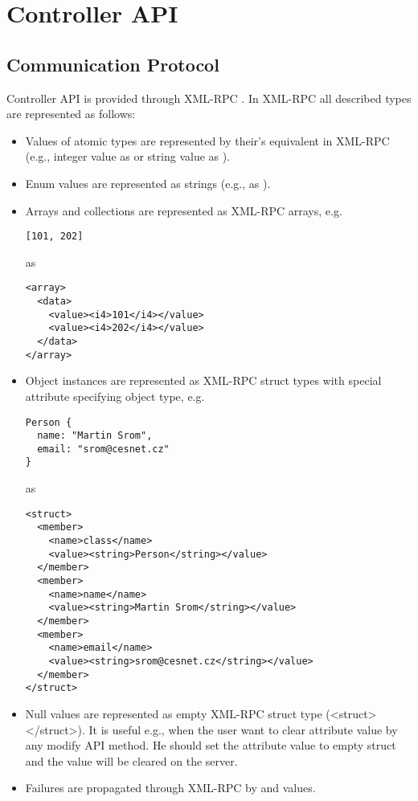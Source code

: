 \chapter{Controller API}



\section{Communication Protocol}
Controller API is provided through XML-RPC \cite{xml-rpc}.
In XML-RPC all described types are represented as follows:

\begin{itemize}

\item Values of atomic types are represented by their's equivalent in XML-RPC (e.g., integer value  as  or string value  as ).

\item Enum values are represented as strings (e.g.,  as ).

\item Arrays and collections are represented as XML-RPC arrays, e.g.
\begin{verbatim}
[101, 202]
\end{verbatim}
as
\begin{verbatim}
<array>
  <data>
    <value><i4>101</i4></value>
    <value><i4>202</i4></value>
  </data>
</array>
\end{verbatim}

\item Object instances are represented as XML-RPC struct types with special  attribute specifying object type, e.g.
\begin{verbatim}
Person {
  name: "Martin Srom",
  email: "srom@cesnet.cz"
}
\end{verbatim}
as
\begin{verbatim}
<struct>
  <member>
    <name>class</name>
    <value><string>Person</string></value>
  </member>
  <member>
    <name>name</name>
    <value><string>Martin Srom</string></value>
  </member>
  <member>
    <name>email</name>
    <value><string>srom@cesnet.cz</string></value>
  </member>
</struct>
\end{verbatim}

\item Null values are represented as empty XML-RPC struct type (<struct></struct>). It is useful e.g., when the user want to clear attribute value by any modify API method. He should set the attribute value to empty struct and the value will be cleared on the server.

\item Failures are propagated through XML-RPC by  and  values.

\end{itemize}


